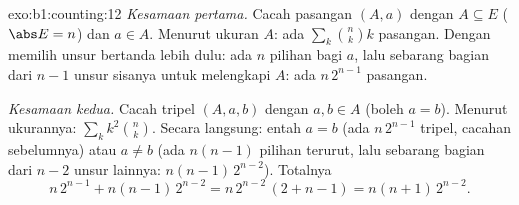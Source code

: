 \begin{solution}{exo:b1:counting:12}
\emph{Kesamaan pertama.} Cacah pasangan $(A, a)$ dengan $A \subseteq E$
($\abs E = n$) dan $a \in A$. Menurut ukuran $A$: ada $\sum_k \binom nk k$
pasangan. Dengan memilih unsur bertanda lebih dulu: ada $n$ pilihan bagi $a$, lalu
sebarang  bagian dari $n - 1$ unsur sisanya untuk melengkapi $A$:
ada $n\,2^{n-1}$ pasangan.

\emph{Kesamaan kedua.} Cacah tripel $(A, a, b)$ dengan $a, b \in
A$ (boleh $a = b$). Menurut ukurannya: $\sum_k k^2 \binom nk$. Secara langsung:
entah $a = b$ (ada $n\,2^{n-1}$ tripel, cacahan sebelumnya) atau $a \neq b$
(ada $n(n-1)$ pilihan terurut, lalu sebarang  bagian dari $n - 2$ unsur
lainnya: $n(n-1)\,2^{n-2}$). Totalnya
\[
n\,2^{n-1} + n(n-1)\,2^{n-2} = n\,2^{n-2}\,(2 + n - 1)
= n(n+1)\,2^{n-2} .
\]
\end{solution}

